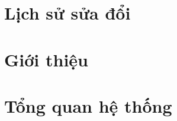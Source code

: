 \documentclass[a4paper]{article}
\begin{document}
\newpage
\thispagestyle{empty}
\tableofcontents

\newpage
\thispagestyle{empty}
\listoffigures
\newpage 

\section{Lịch sử sửa đổi}


\newpage 

\section{Giới thiệu}


\section{Tổng quan hệ thống}


\newpage 










\end{document}

